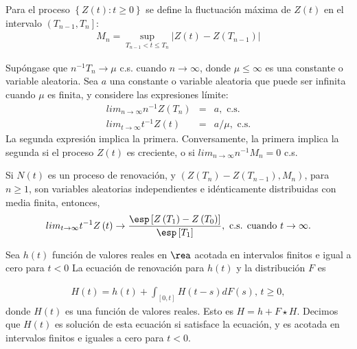 \begin{Def}
Para el proceso $\left\{Z\left(t\right):t\geq0\right\}$ se define la fluctuaci\'on m\'axima de $Z\left(t\right)$ en el intervalo $\left(T_{n-1},T_{n}\right]$:
\begin{eqnarray*}
M_{n}=\sup_{T_{n-1}<t\leq T_{n}}|Z\left(t\right)-Z\left(T_{n-1}\right)|
\end{eqnarray*}
\end{Def}

\begin{Teo}
Sup\'ongase que $n^{-1}T_{n}\rightarrow\mu$ c.s. cuando $n\rightarrow\infty$, donde $\mu\leq\infty$ es una constante o variable aleatoria. Sea $a$ una constante o variable aleatoria que puede ser infinita cuando $\mu$ es finita, y considere las expresiones l\'imite:
\begin{eqnarray}
lim_{n\rightarrow\infty}n^{-1}Z\left(T_{n}\right)&=&a,\textrm{ c.s.}\\
lim_{t\rightarrow\infty}t^{-1}Z\left(t\right)&=&a/\mu,\textrm{ c.s.}
\end{eqnarray}
La segunda expresi\'on implica la primera. Conversamente, la primera implica la segunda si el proceso $Z\left(t\right)$ es creciente, o si $lim_{n\rightarrow\infty}n^{-1}M_{n}=0$ c.s.
\end{Teo}

\begin{Coro}
Si $N\left(t\right)$ es un proceso de renovaci\'on, y $\left(Z\left(T_{n}\right)-Z\left(T_{n-1}\right),M_{n}\right)$, para $n\geq1$, son variables aleatorias independientes e id\'enticamente distribuidas con media finita, entonces,
\begin{eqnarray}
lim_{t\rightarrow\infty}t^{-1}Z\left(t\right)\rightarrow\frac{\esp\left[Z\left(T_{1}\right)-Z\left(T_{0}\right)\right]}{\esp\left[T_{1}\right]},\textrm{ c.s. cuando  }t\rightarrow\infty.
\end{eqnarray}
\end{Coro}


%
%


\begin{Def}
Sea $h\left(t\right)$ funci\'on de valores reales en $\rea$ acotada en intervalos finitos e igual a cero para $t<0$ La ecuaci\'on de renovaci\'on para $h\left(t\right)$ y la distribuci\'on $F$ es

\begin{eqnarray}%
H\left(t\right)=h\left(t\right)+\int_{\left[0,t\right]}H\left(t-s\right)dF\left(s\right)\textrm{,    }t\geq0,
\end{eqnarray}
donde $H\left(t\right)$ es una funci\'on de valores reales. Esto es $H=h+F\star H$. Decimos que $H\left(t\right)$ es soluci\'on de esta ecuaci\'on si satisface la ecuaci\'on, y es acotada en intervalos finitos e iguales a cero para $t<0$.
\end{Def}

